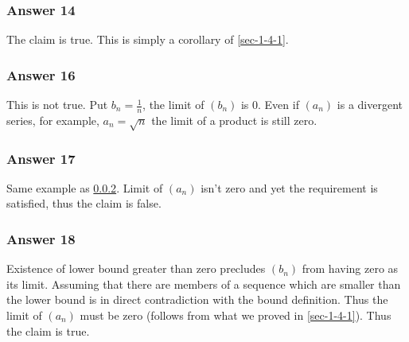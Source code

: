 \documentclass[11pt]{article}
\begin{document}
\subsubsection{Answer 14}
\label{sec-1-4-3}
The claim is true. This is simply a corollary of \ref{sec-1-4-1}.
\subsubsection{Answer 16}
\label{sec-1-4-4}
This is not true.  Put $b_n = \frac{1}{n}$, the limit of $(b_n)$ is 0.  Even
if $(a_n)$ is a divergent series, for example, $a_n = \sqrt{n}$ the limit of
a product is still zero.
\subsubsection{Answer 17}
\label{sec-1-4-5}
Same example as \ref{sec-1-4-4}.  Limit of $(a_n)$ isn't zero and yet the
requirement is satisfied, thus the claim is false.
\subsubsection{Answer 18}
\label{sec-1-4-6}
Existence of lower bound greater than zero precludes $(b_n)$ from having
zero as its limit.  Assuming that there are members of a sequence which
are smaller than the lower bound is in direct contradiction with the
bound definition.  Thus the limit of $(a_n)$ must be zero (follows from
what we proved in \ref{sec-1-4-1}).  Thus the claim is true.
\end{document}
